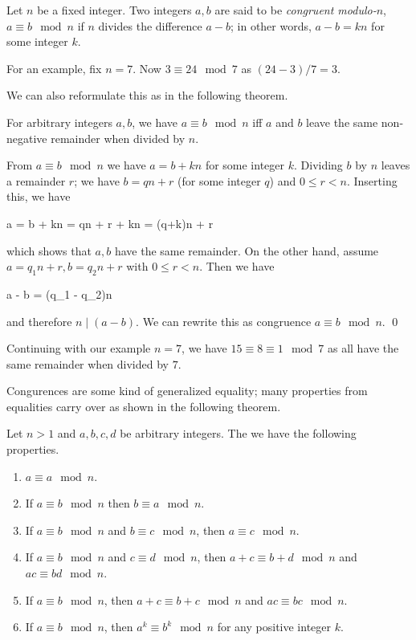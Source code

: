 
\begin{definition}
    Let $n$ be a fixed integer. Two integers $a, b$ are said to be \emph{congruent modulo-$n$}, $a \equiv b \mod n$ if $n$ divides the difference $a - b$; in other words, $a - b = kn$ for some integer $k$.
\end{definition}

For an example, fix $n = 7$. Now $3 \equiv 24 \mod 7$ as $(24-3) / 7 = 3$.

We can also reformulate this as in the following theorem.

\begin{theorem}
    For arbitrary integers $a, b$, we have $a \equiv b \mod n$ iff $a$ and $b$ leave the same non-negative remainder when divided by $n$.
\end{theorem}

From $a \equiv b \mod n$ we have $a = b + kn$ for some integer $k$. Dividing $b$ by $n$ leaves a remainder $r$; we have $b = qn + r$ (for some integer $q$) and $0 \leq r < n$. Inserting this, we have

\bee
a = b + kn = qn + r + kn = (q+k)n + r
\eee

which shows that $a, b$ have the same remainder. On the other hand, assume $a = q_1 n + r, b = q_2 n + r$ with $0 \leq r < n$. Then we have

\bee
a - b = (q_1 - q_2)n
\eee

and therefore $n \mid (a-b)$. We can rewrite this as congruence $a \equiv b \mod n$. \qed

Continuing with our example $n = 7$, we have $15 \equiv 8 \equiv 1 \mod 7$ as all have the same remainder when divided by $7$.

Congurences are some kind of generalized equality; many properties from equalities carry over as shown in the following theorem.

\begin{theorem}
    Let $n > 1$ and $a, b, c, d$ be arbitrary integers. The we have the following properties.

    \begin{enumerate}
        \item $a \equiv a \mod n$.
        \item If $a \equiv b \mod n$ then $b \equiv a \mod n$.
        \item If $a \equiv b \mod n$ and $b \equiv c \mod n$, then $a \equiv c \mod n$.
        \item If $a \equiv b \mod n$ and $c \equiv d \mod n$, then $a+c \equiv b+d \mod n$ and $ac \equiv bd \mod n$.
        \item If $a \equiv b \mod n$, then $a+c \equiv b+c \mod n$ and $ac \equiv bc \mod n$.
        \item If $a \equiv b \mod n$, then $a^k \equiv b^k \mod n$ for any positive integer $k$.
    \end{enumerate}

\end{theorem}

